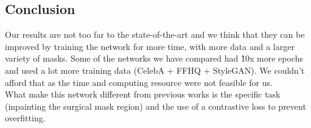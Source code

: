 \documentclass[10pt,twocolumn,letterpaper]{article}
\begin{document}
\subsection{Conclusion}
Our results are not too far to the state-of-the-art and we think that they can
be improved by training the network for more time, with more data and a larger
variety of masks. Some of the networks we have compared had \~10x more epochs
and used a lot more training data (CelebA + FFHQ + StyleGAN). We couldn't afford
that as the time and computing resource were not feasible for us.\\
What make this network different from previous works is the specific task
(inpainting the surgical mask region) and the use of a contrastive loss to
prevent overfitting.

{\small


}
\end{document}
